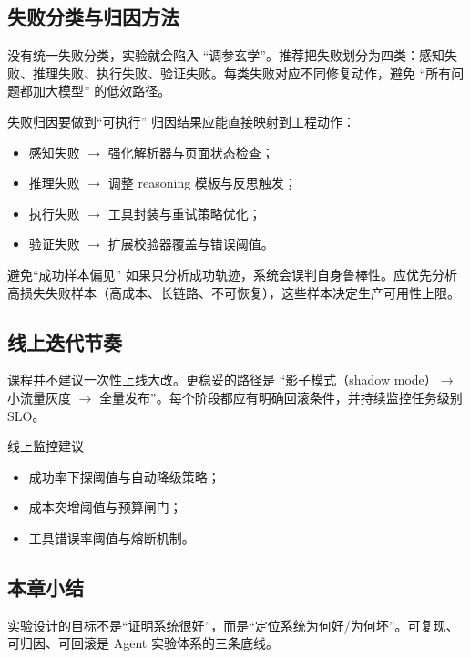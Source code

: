 \documentclass[a4paper]{article}
\begin{document}
\subsection{失败分类与归因方法}
没有统一失败分类，实验就会陷入 ``调参玄学''。推荐把失败划分为四类：感知失败、推理失败、执行失败、验证失败。每类失败对应不同修复动作，避免 ``所有问题都加大模型'' 的低效路径。

\begin{importantbox}{失败归因要做到“可执行”}
归因结果应能直接映射到工程动作：
\begin{itemize}
    \item 感知失败 $\rightarrow$ 强化解析器与页面状态检查；
    \item 推理失败 $\rightarrow$ 调整 reasoning 模板与反思触发；
    \item 执行失败 $\rightarrow$ 工具封装与重试策略优化；
    \item 验证失败 $\rightarrow$ 扩展校验器覆盖与错误阈值。
\end{itemize}
\end{importantbox}

\begin{warningbox}{避免“成功样本偏见”}
如果只分析成功轨迹，系统会误判自身鲁棒性。应优先分析高损失失败样本（高成本、长链路、不可恢复），这些样本决定生产可用性上限。
\end{warningbox}

\subsection{线上迭代节奏}
课程并不建议一次性上线大改。更稳妥的路径是 ``影子模式（shadow mode）$\rightarrow$ 小流量灰度 $\rightarrow$ 全量发布''。每个阶段都应有明确回滚条件，并持续监控任务级别 SLO。

\begin{knowledgebox}{线上监控建议}
\begin{itemize}
    \item 成功率下探阈值与自动降级策略；
    \item 成本突增阈值与预算闸门；
    \item 工具错误率阈值与熔断机制。
\end{itemize}
\end{knowledgebox}

\subsection{本章小结}
实验设计的目标不是“证明系统很好”，而是“定位系统为何好/为何坏”。可复现、可归因、可回滚是 Agent 实验体系的三条底线。
\end{document}
